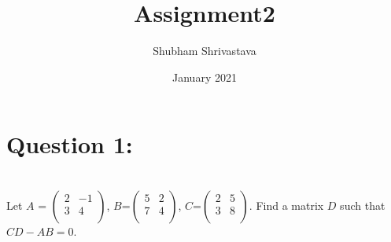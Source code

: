 \documentclass{article}
\title{Assignment2}
\author{Shubham Shrivastava }
\date{January 2021}
\begin{document}
\maketitle

\section*{Question 1:}\\
Let $A$ = $\begin{pmatrix}
2 & -1\\
3 & 4\\
\end{pmatrix}$, $B$=$\begin{pmatrix}5 & 2\\7 & 4\\\end{pmatrix}$, $C$=$\begin{pmatrix}2 & 5\\3 & 8\\\end{pmatrix}$. Find a
matrix $D$ such that $CD-AB=0$.
\end{document}
